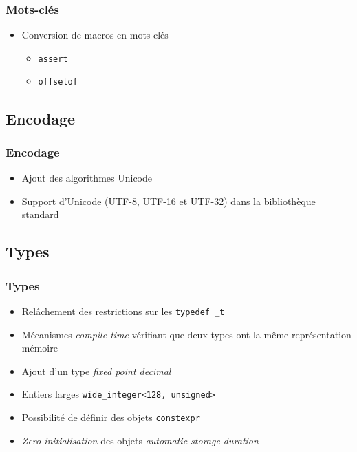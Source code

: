 \documentclass[C++.tex]{subfiles}
\begin{document}
\begin{frame}[fragile]
	\frametitle{Mots-clés}
	\begin{itemize}
		\item Conversion de macros en mots-clés


		\begin{itemize}
			\item \lstinline|assert|
			\item \lstinline|offsetof|
		\end{itemize}
	\end{itemize}
\end{frame}

\subsection*{Encodage}
\begin{frame}[fragile]
	\frametitle{Encodage}
	\begin{itemize}
		\item Ajout des algorithmes Unicode


		\item Support d'Unicode (UTF-8, UTF-16 et UTF-32) dans la bibliothèque standard
	\end{itemize}
\end{frame}

\subsection*{Types}
\begin{frame}[fragile]
	\frametitle{Types}
	\begin{itemize}
		\item Relâchement des restrictions sur les \lstinline|typedef _t|
		\item Mécanismes \textit{compile-time} vérifiant que deux types ont la même représentation mémoire


		\item Ajout d'un type \og{}\textit{fixed point decimal}\fg{}
		\item Entiers larges \lstinline|wide_integer<128, unsigned>|
		\item Possibilité de définir des objets \lstinline|constexpr|
		\item \textit{Zero-initialisation} des objets \textit{automatic storage duration}

	\end{itemize}
\end{frame}
\end{document}
